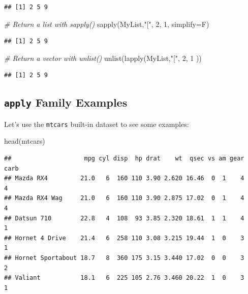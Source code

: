 \documentclass[
]{book}
\newenvironment{Shaded}{\begin{snugshade}}{\end{snugshade}}
\newcommand{\AttributeTok}[1]{\textcolor[rgb]{0.77,0.63,0.00}{#1}}
\newcommand{\CommentTok}[1]{\textcolor[rgb]{0.56,0.35,0.01}{\textit{#1}}}
\newcommand{\DecValTok}[1]{\textcolor[rgb]{0.00,0.00,0.81}{#1}}
\newcommand{\FunctionTok}[1]{\textcolor[rgb]{0.00,0.00,0.00}{#1}}
\newcommand{\NormalTok}[1]{#1}
\newcommand{\StringTok}[1]{\textcolor[rgb]{0.31,0.60,0.02}{#1}}
\begin{document}
\begin{verbatim}
## [1] 2 5 9
\end{verbatim}

\begin{Shaded}
\begin{Highlighting}[]
\CommentTok{\# Return a list with \textasciigrave{}sapply()\textasciigrave{}}
\FunctionTok{sapply}\NormalTok{(MyList,}\StringTok{"["}\NormalTok{, }\DecValTok{2}\NormalTok{, }\DecValTok{1}\NormalTok{, }\AttributeTok{simplify=}\NormalTok{F)}
\end{Highlighting}
\end{Shaded}

\begin{verbatim}
## [1] 2 5 9
\end{verbatim}

\begin{Shaded}
\begin{Highlighting}[]
\CommentTok{\# Return a vector with \textasciigrave{}unlist()\textasciigrave{}}
\FunctionTok{unlist}\NormalTok{(}\FunctionTok{lapply}\NormalTok{(MyList,}\StringTok{"["}\NormalTok{, }\DecValTok{2}\NormalTok{, }\DecValTok{1}\NormalTok{ ))}
\end{Highlighting}
\end{Shaded}

\begin{verbatim}
## [1] 2 5 9
\end{verbatim}

\hypertarget{apply-family-examples}{%
\subsection{\texorpdfstring{\texttt{apply} Family Examples}{apply Family Examples}}\label{apply-family-examples}}

Let's use the \texttt{mtcars} built-in dataset to see some examples:

\begin{Shaded}
\begin{Highlighting}[]
\FunctionTok{head}\NormalTok{(mtcars)}
\end{Highlighting}
\end{Shaded}

\begin{verbatim}
##                    mpg cyl disp  hp drat    wt  qsec vs am gear carb
## Mazda RX4         21.0   6  160 110 3.90 2.620 16.46  0  1    4    4
## Mazda RX4 Wag     21.0   6  160 110 3.90 2.875 17.02  0  1    4    4
## Datsun 710        22.8   4  108  93 3.85 2.320 18.61  1  1    4    1
## Hornet 4 Drive    21.4   6  258 110 3.08 3.215 19.44  1  0    3    1
## Hornet Sportabout 18.7   8  360 175 3.15 3.440 17.02  0  0    3    2
## Valiant           18.1   6  225 105 2.76 3.460 20.22  1  0    3    1
\end{verbatim}
\end{document}
